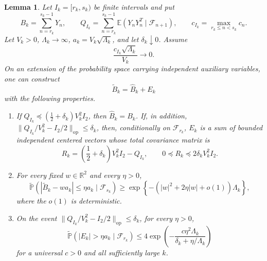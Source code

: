\documentclass[12pt, reqno, final, a4paper]{amsart}
\theoremstyle{plain}
\newtheorem{lemma}[theorem]{Lemma}
\theoremstyle{definition}
\theoremstyle{remark}
\newcommand{\E}{\mathbb E}
\newcommand{\1}{\mathbf 1}
\begin{document}
\begin{lemma}
\label{lem:completed-block}
Let $I_k=[r_k,s_k)$ be finite intervals and put
\[
 B_k=\sum_{n=r_k}^{s_k-1}Y_n,
 \qquad
 Q_{I_k}=\sum_{n=r_k}^{s_k-1}
 \E(Y_nY_n^T\mid\mathcal F_{n+1}),
 \qquad
 c_{I_k}=\max_{r_k\le n<s_k}c_n.
\]
Let $V_k>0$, $\Lambda_k\to\infty$, $a_k=V_k\sqrt{\Lambda_k}$, and let
$\delta_k\downarrow0$. Assume
\begin{equation}\label{eq:completed-block-small-increments}
 \frac{c_{I_k}\sqrt{\Lambda_k}}{V_k}\longrightarrow0.
\end{equation}
On an extension of the probability space carrying independent auxiliary
variables, one can construct
\[
 \widetilde B_k=\widehat B_k+E_k
\]
with the following properties.
\begin{enumerate}
 \item If
 $Q_{I_k}\preceq(\frac12+\delta_k)V_k^2I_2$, then
 $\widehat B_k=B_k$. If, in addition,
 $\|Q_{I_k}/V_k^2-I_2/2\|_{\mathrm{op}}\le\delta_k$, then, conditionally on
 $\mathcal F_{r_k}$, $E_k$ is a sum of bounded independent centered vectors
 whose total covariance matrix is
 \[
 R_k=\left(\frac12+\delta_k\right)V_k^2I_2-Q_{I_k},
 \qquad 0\preceq R_k\preceq2\delta_kV_k^2I_2.
 \]
 \item For every fixed $w\in\mathbb R^2$ and every $\eta>0$,
 \begin{equation}\label{eq:completed-block-lower}
 \widetilde{\mathbb P}\left(
 |\widetilde B_k-wa_k|\le\eta a_k\mid\mathcal F_{s_k}
 \right)
 \ge
 \exp\left\{-(|w|^2+2\eta|w|+o(1))\Lambda_k\right\},
 \end{equation}
 where the $o(1)$ is deterministic.
 \item On the event
 $\|Q_{I_k}/V_k^2-I_2/2\|_{\mathrm{op}}\le\delta_k$, for every $\eta>0$,
 \begin{equation}\label{eq:completion-tail}
 \widetilde{\mathbb P}\left(
 |E_k|>\eta a_k\mid\mathcal F_{r_k}
 \right)
 \le4\exp\left(
 -\frac{c\eta^2\Lambda_k}{\delta_k+\eta/\Lambda_k}
 \right)
 \end{equation}
 for a universal $c>0$ and all sufficiently large $k$.
\end{enumerate}
\end{lemma}
\end{document}
